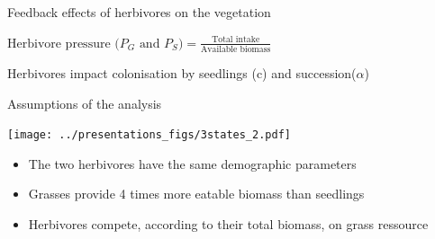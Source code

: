 \documentclass[10pt,aspectratio=149]{beamer}
\begin{document}
\begin{frame}{Feedback effects of herbivores on the vegetation}


\vspace{1em}
$\text{Herbivore pressure ($P_G$ and $P_S$)} = \frac{\text{Total intake}}{\text{Available biomass}}$\\
\vspace{1em}

Herbivores impact \alert{colonisation by seedlings (c)} and \alert{succession($\alpha$)}







\end{frame}

\begin{frame}{Assumptions of the analysis}

\centering
\texttt{[image: ../presentations\_figs/3states\_2.pdf]}

\small{
\begin{itemize}

\item The two herbivores have the same demographic parameters

\item Grasses provide 4 times more eatable biomass than seedlings

\item Herbivores \alert{compete}, according to their total biomass, on grass ressource 

\end{itemize}
}

\end{frame}
\end{document}
